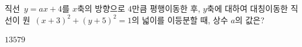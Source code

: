 직선~$y=ax+4$를 $x$축의 방향으로 $4$만큼 평행이동한 후, $y$축에 대하여 대칭이동한 직선이 원~$(x+3)^2+(y+5)^2=1$의 넓이를 이등분할 때, 상수 $a$의 값은?
\begin{choices32}{$1$}{$3$}{$5$}{$7$}{$9$}\end{choices32}
